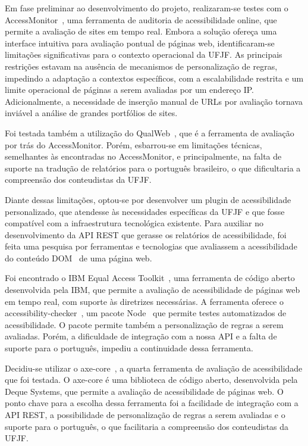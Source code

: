 \documentclass[
	article,			%
	12pt,				%
	oneside,			%
	a4paper,			%
	section=TITLE,		%
	subsection=TITLE,	%
	english,			%
	brazil,				%
	sumario=tradicional
	]{abntex2}
\begin{document}
Em fase preliminar ao desenvolvimento do projeto, realizaram-se testes com o
AccessMonitor~\cite{AM},
uma ferramenta de auditoria de acessibilidade online, que permite a avaliação de
sites em tempo real. Embora a solução ofereça uma interface intuitiva para
avaliação pontual de páginas web, identificaram-se limitações significativas para o
contexto operacional da UFJF. As principais restrições estavam na ausência de
mecanismos de personalização de regras, impedindo a adaptação a contextos
específicos, com a escalabilidade restrita e um limite operacional de páginas a
serem avaliadas por um endereço IP\@. Adicionalmente, a necessidade de inserção
manual de URLs por avaliação tornava inviável a análise de grandes portfólios de
sites\@.

Foi testada também a utilização do QualWeb~\cite{qualweb}, que é a ferramenta
de avaliação por trás do AccessMonitor. Porém, esbarrou-se em limitações técnicas,
semelhantes às encontradas no AccessMonitor, e principalmente, na falta de suporte
na tradução de relatórios para o português brasileiro, o que dificultaria a compreensão dos
conteudistas da UFJF\@.

Diante dessas limitações, optou-se por desenvolver um plugin de acessibilidade
personalizado, que atendesse às necessidades específicas da UFJF e que fosse
compatível com a infraestrutura tecnológica existente. Para auxiliar no
desenvolvimento da API REST que gerasse os relatórios de acessibilidade,
foi feita uma pesquisa por ferramentas e tecnologias que avaliassem a acessibilidade
do conteúdo DOM~\cite{DOM} de uma página web.

Foi encontrado o IBM Equal Access Toolkit~\cite{IBMa}, uma ferramenta de código
aberto desenvolvida pela IBM, que permite a avaliação de acessibilidade de páginas
web em tempo real, com suporte às diretrizes necessárias. A ferramenta oferece
o accessibility-checker~\cite{AC}, um pacote Node~\cite{Node} que permite 
testes automatizados de acessibilidade. O pacote permite também a personalização de
regras a serem avaliadas. Porém, a dificuldade de integração com a nossa API e a falta de suporte para o
português, impediu a continuidade dessa ferramenta.

Decidiu-se utilizar o axe-core~\cite{axecore}, a quarta
ferramenta de avaliação de acessibilidade que foi testada. O axe-core é uma biblioteca
de código aberto, desenvolvida pela Deque Systems, que permite a avaliação de acessibilidade
de páginas web. O ponto chave para a escolha dessa ferramenta foi a facilidade
de integração com a API REST, a possibilidade de personalização de regras a serem
avaliadas e o suporte para o português, o que facilitaria a compreensão dos conteudistas
da UFJF\@.
\end{document}
